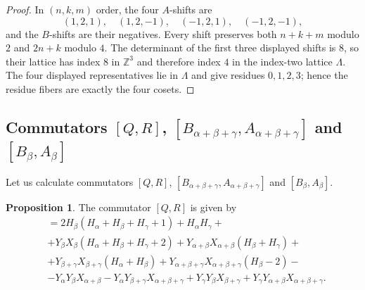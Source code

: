 \documentclass[twoside,a4paper,12pt]{article}
\theoremstyle{definition}
\newtheorem{proposition}{Proposition}
\begin{document}
\begin{proof} In $(n,k,m)$ order, the four $A$-shifts are
	\[ (1,2,1),\quad(1,2,-1),\quad(-1,2,1),\quad(-1,2,-1), \]
	and the $B$-shifts are their negatives.  Every shift preserves both
	$n+k+m$ modulo $2$ and $2n+k$ modulo $4$.  The determinant of the first
	three displayed shifts is $8$, so their lattice has index $8$ in
	$\mathbb Z^3$ and therefore index $4$ in the index-two lattice $\Lambda$.
	The four displayed representatives lie in $\Lambda$ and give residues
	$0,1,2,3$; hence the residue fibers are exactly the four cosets.
\end{proof}



\subsection{Commutators $[Q,R]$,
	$[B_{\alpha+\beta+\gamma},A_{\alpha+\beta+\gamma}]$ and $[B_\beta,A_\beta]$}

Let us calculate commutators $[Q,R]$,
$[B_{\alpha+\beta+\gamma},A_{\alpha+\beta+\gamma}]$ and $[B_\beta,A_\beta]$.

\begin{proposition}\label{qr}
	The commutator $[Q,R]$ is given by
	\begin{align*}
		[Q,R]&=2H_\beta(H_\alpha+H_\beta+H_\gamma+1)+H_\alpha H_\gamma+\\
			 &+Y_\beta X_\beta(H_\alpha+H_\beta+H_\gamma+2)
			 	+Y_{\alpha+\beta}X_{\alpha+\beta}(H_\beta+H_\gamma)+\\
			 &+Y_{\beta+\gamma}X_{\beta+\gamma}(H_\alpha+H_\beta)
			 	+Y_{\alpha+\beta+\gamma}X_{\alpha+\beta+\gamma}(H_\beta-2)-\\
			 &-Y_\alpha Y_\beta X_{\alpha+\beta}
			 	-Y_\alpha Y_{\beta+\gamma}X_{\alpha+\beta+\gamma}
			 	+Y_\gamma Y_\beta X_{\beta+\gamma}
			 	+Y_\gamma Y_{\alpha+\beta}X_{\alpha+\beta+\gamma}.
	\end{align*}
\end{proposition}
\end{document}
